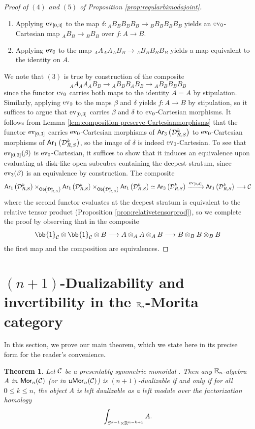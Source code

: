 \documentclass[10pt, reqno, twoside
, final
]{amsart}
\numberwithin{equation}{subsection}%
\theoremstyle{definition}
\theoremstyle{definition}
\theoremstyle{definition}
\theoremstyle{definition}
\theoremstyle{definition}
\theoremstyle{definition}
\theoremstyle{definition}
\theoremstyle{definition}
\theoremstyle{definition}
\theoremstyle{plain}
\newtheorem{thm}[defn]{Theorem}
\theoremstyle{definition}
\theoremstyle{plain}
\theoremstyle{definition}
\theoremstyle{plain}
\theoremstyle{definition}
\theoremstyle{definition}
\theoremstyle{plain}
\theoremstyle{plain}
\theoremstyle{definition}
\theoremstyle{plain}
\theoremstyle{plain}
\theoremstyle{plain}
\begin{document}
\begin{proof}[Proof of $(4)$ and $(5)$ of Proposition \ref{prop:regularbimodajoint}]
\begin{enumerate}[$(1)$]
    \item Applying $\mathrm{ev}_{[0,3]}$ to the map $\delta:{}_AB_BB_BB_B \rightarrow {}_BB_BB_BB_B$ yields an $\mathrm{ev}_{0}$-Cartesian map ${}_AB_B\rightarrow {}_BB_B$ over $f:A\rightarrow B$.
    \item Applying $\mathrm{ev}_{0}$ to the map $ {}_AA_AA_AB_B\rightarrow {}_AB_BB_BB_B$ yields a map equivalent to the identity on $A$.
\end{enumerate}
We note that $(3)$ is true by construction of the composite 
\[  {}_AA_AA_AB_B \longrightarrow  {}_AB_BB_AB_B\longrightarrow {}_AB_B B_B B_B  \]
since the functor $\mathrm{ev}_0$ carries both maps to the identity $A=A$ by stipulation. Similarly, applying $\mathrm{ev}_0$ to the maps $\beta$ and $\delta$ yields $f:A\rightarrow B$ by stipulation, so it suffices to argue that $\mathrm{ev}_{[0,3]}$ carries $\beta$ and $\delta$ to $\mathrm{ev}_0$-Cartesian morphisms. It follows from Lemma \ref{lem:composition-preserve-Cartesianmorphisms} that the functor $\mathrm{ev}_{[0,3]}$ carries $\mathrm{ev}_0$-Cartesian morphisms of $\mathsf{Ar}_3\left(\mathcal{D}^k_{R,S}\right)$ to $\mathrm{ev}_0$-Cartesian morphisms of $\mathsf{Ar}_1\left(\mathcal{D}^k_{R,S}\right)$, so the image of $\delta$ is indeed $\mathrm{ev}_0$-Cartesian. To see that $\mathrm{ev}_{[0,3]}(\beta)$ is $\mathrm{ev}_0$-Cartesian, it suffices to show that it induces an equivalence upon evaluating at disk-like open subcubes containing the deepest stratum, since $\mathrm{ev}_3(\beta)$ is an equivalence by construction. The composite
\[  \mathsf{Ar}_1\left(\mathcal{D}^k_{R,S}\right)\times_{\mathsf{Ob}\left(\mathcal{D}^k_{R,S}\right)}\mathsf{Ar}_1\left(\mathcal{D}^k_{R,S}\right)\times_{\mathsf{Ob}\left(\mathcal{D}^k_{R,S}\right)}\mathsf{Ar}_1\left(\mathcal{D}^k_{R,S}\right)\simeq \mathsf{Ar}_3\left(\mathcal{D}^k_{R,S}\right) \xrightarrow{\mathrm{ev}_{[0,3]}}\mathsf{Ar}_1\left(\mathcal{D}^k_{R,S}\right) \longrightarrow \mathcal{C}   \]
where the second functor evaluates at the deepest stratum is equivalent to the relative tensor product (Proposition \ref{prop:relativetensorprod}), so we complete the proof by observing that in the composite
\[ \bb{1}_{\icat}\otimes \bb{1}_{\icat}\otimes B\longrightarrow   A\otimes_AA\otimes_AB\longrightarrow  B\otimes_BB\otimes_BB \]
the first map and the composition are equivalences.
\end{proof}

\section{$(n+1)$-Dualizability and invertibility in the $\mathbb{E}_n$-Morita category}
In this section, we prove our main theorem, which we state here in its precise form for the reader's convenience.
\begin{thm}\label{thm:mainthm}
Let $\mathcal{C}$ be a presentably symmetric monoidal \infcatt. Then any $\mathbb{E}_n$-algebra $A$ in $\mathsf{Mor}_n(\mathcal{C})$ (or in $\mathfrak{u}\mathsf{Mor}_n(\mathcal{C})$) is $(n+1)$-dualizable if and only if for all $0\leq k\leq n$, the object $A$ is left dualizable as a left module over the factorization homology 
\[  \int_{S^{k-1}\times \mathbb{R}^{n-k+1}}A. \]
\end{thm}
\end{document}
